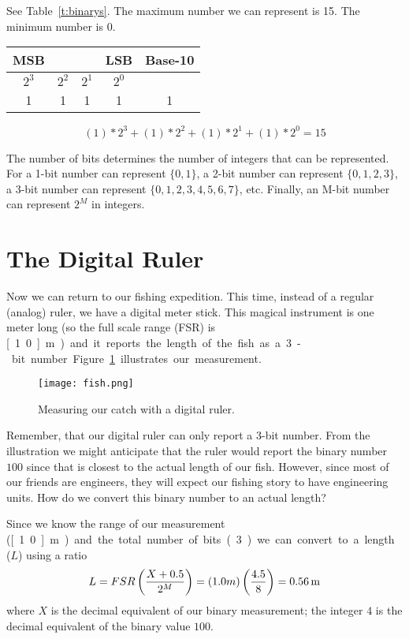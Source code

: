 \begin{soln}
See Table~\ref{t:binarys}.  The maximum number we can represent is 15.  The minimum number is 0.
\begin{table*}[bt!] 
\renewcommand{\arraystretch}{1.2}
\caption{Solution}
\label{t:binarys}
\centering
\begin{tabular}{|c|c|c|c||c|}\hline
MSB &\hspace{4ex} & \hspace{4ex}& LSB & Base-10\\ \hline \hline
$2^3$ & $2^2$ & $2^1$ & $2^0$ & \\ \hline \hline
1 & 1 & 1 & 1 & 1 \\ \hline
\end{tabular}
\end{table*}
\[ (1)*2^3+(1)*2^2+(1)*2^1+(1)*2^0 = 15 \]

\end{soln}

\fi


The number of bits determines the number of integers that can be represented.  For a 1-bit number can represent $\{0,1\}$, a 2-bit number can represent $\{0,1,2,3\}$, a 3-bit number can represent $\{0,1,2,3,4,5,6,7\}$, etc.  Finally, an M-bit number can represent $2^M$ in integers.  

\section{The Digital Ruler}
Now we can return to our fishing expedition.  This time, instead of a regular (analog) ruler, we have a digital meter stick.  This magical instrument is one meter long (so the full scale range (FSR) is \unit[1.0]{m}) and it reports the length of the fish as a 3-bit number.  Figure~\ref{f:fish} illustrates our measurement.
\begin{figure}[hbt!]
\centering
\texttt{[image: fish.png]}
\caption{Measuring our catch with a digital ruler.}
\label{f:fish}
\end{figure}

Remember, that our digital ruler can only report a 3-bit number.  From the illustration we might anticipate that the ruler would report the binary number $100$ since that is closest to the actual length of our fish.  However, since most of our friends are engineers, they will expect our fishing story to have engineering units.  How do we convert this binary number to an actual length?

Since we know the range of our measurement (\unit[1.0]{m}) and the total number of bits (3) we can convert to a length ($L$) using a ratio
\begin{equation}
L = FSR \left(\frac{X+0.5}{2^M}\right) 
= (1.0 m)\left(\frac{4.5}{8}\right) = \unit[0.56]{m}
\end{equation}
where $X$ is the decimal equivalent of our binary measurement; the integer $4$ is the decimal equivalent of the binary value $100$.  

